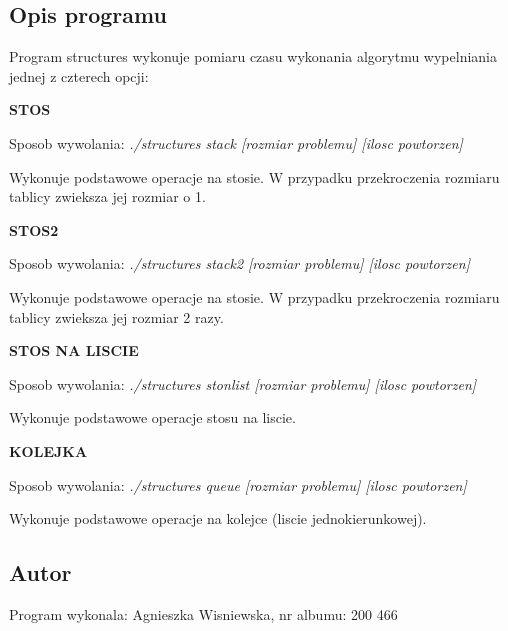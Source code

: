 \hypertarget{index_opis}{}\subsection{Opis programu}\label{index_opis}
Program structures wykonuje pomiaru czasu wykonania algorytmu wypelniania jednej z czterech opcji\-: \par
\par
 {\bfseries S\-T\-O\-S}\par
 Sposob wywolania\-: {\itshape {\ttfamily ./structures stack \mbox{[}rozmiar problemu\mbox{]} \mbox{[}ilosc powtorzen\mbox{]}}}\par
 Wykonuje podstawowe operacje na stosie. W przypadku przekroczenia rozmiaru tablicy zwieksza jej rozmiar o 1.\par


{\bfseries S\-T\-O\-S2}\par
 Sposob wywolania\-: {\itshape {\ttfamily ./structures stack2 \mbox{[}rozmiar problemu\mbox{]} \mbox{[}ilosc powtorzen\mbox{]}}}\par
 Wykonuje podstawowe operacje na stosie. W przypadku przekroczenia rozmiaru tablicy zwieksza jej rozmiar 2 razy.\par


{\bfseries S\-T\-O\-S N\-A L\-I\-S\-C\-I\-E}\par
 Sposob wywolania\-: {\itshape {\ttfamily ./structures stonlist \mbox{[}rozmiar problemu\mbox{]} \mbox{[}ilosc powtorzen\mbox{]}}}\par
 Wykonuje podstawowe operacje stosu na liscie.\par


{\bfseries K\-O\-L\-E\-J\-K\-A}\par
 Sposob wywolania\-: {\itshape {\ttfamily ./structures queue \mbox{[}rozmiar problemu\mbox{]} \mbox{[}ilosc powtorzen\mbox{]}}}\par
 Wykonuje podstawowe operacje na kolejce (liscie jednokierunkowej).\par
\par
\hypertarget{index_autor}{}\subsection{Autor}\label{index_autor}
Program wykonala\-: Agnieszka Wisniewska, nr albumu\-: 200 466 